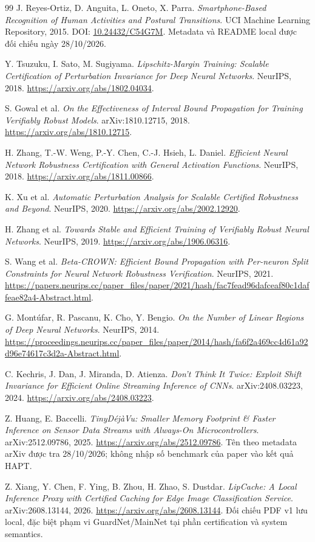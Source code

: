\documentclass[11pt,a4paper]{article}
\theoremstyle{remark}
\begin{document}
\begingroup\small
\begin{thebibliography}{99}
 J. Reyes-Ortiz, D. Anguita, L. Oneto, X. Parra.
\emph{Smartphone-Based Recognition of Human Activities and Postural
Transitions}. UCI Machine Learning Repository, 2015.
DOI: \href{https://doi.org/10.24432/C54G7M}{10.24432/C54G7M}.
Metadata và README local được đối chiếu ngày 28/10/2026.

 Y. Tsuzuku, I. Sato, M. Sugiyama.
\emph{Lipschitz-Margin Training: Scalable Certification of Perturbation
Invariance for Deep Neural Networks}. NeurIPS, 2018.
\url{https://arxiv.org/abs/1802.04034}.

 S. Gowal et al.
\emph{On the Effectiveness of Interval Bound Propagation for Training
Verifiably Robust Models}. arXiv:1810.12715, 2018.
\url{https://arxiv.org/abs/1810.12715}.

 H. Zhang, T.-W. Weng, P.-Y. Chen, C.-J. Hsieh, L. Daniel.
\emph{Efficient Neural Network Robustness Certification with General
Activation Functions}. NeurIPS, 2018.
\url{https://arxiv.org/abs/1811.00866}.

 K. Xu et al.
\emph{Automatic Perturbation Analysis for Scalable Certified Robustness
and Beyond}. NeurIPS, 2020.
\url{https://arxiv.org/abs/2002.12920}.

 H. Zhang et al.
\emph{Towards Stable and Efficient Training of Verifiably Robust Neural
Networks}. NeurIPS, 2019.
\url{https://arxiv.org/abs/1906.06316}.

 S. Wang et al.
\emph{Beta-CROWN: Efficient Bound Propagation with Per-neuron Split
Constraints for Neural Network Robustness Verification}. NeurIPS, 2021.
\url{https://papers.neurips.cc/paper_files/paper/2021/hash/fac7fead96dafceaf80c1daffeae82a4-Abstract.html}.

 G. Mont\'ufar, R. Pascanu, K. Cho, Y. Bengio.
\emph{On the Number of Linear Regions of Deep Neural Networks}.
NeurIPS, 2014.
\url{https://proceedings.neurips.cc/paper_files/paper/2014/hash/fa6f2a469cc4d61a92d96e74617c3d2a-Abstract.html}.

 C. Kechris, J. Dan, J. Miranda, D. Atienza.
\emph{Don't Think It Twice: Exploit Shift Invariance for Efficient Online
Streaming Inference of CNNs}. arXiv:2408.03223, 2024.
\url{https://arxiv.org/abs/2408.03223}.

 Z. Huang, E. Baccelli.
\emph{TinyD\'ej\`aVu: Smaller Memory Footprint \& Faster Inference on Sensor
Data Streams with Always-On Microcontrollers}. arXiv:2512.09786, 2025.
\url{https://arxiv.org/abs/2512.09786}. Tên theo metadata arXiv được tra
28/10/2026; không nhập số benchmark của paper vào kết quả HAPT.

 Z. Xiang, Y. Chen, F. Ying, B. Zhou, H. Zhao, S. Dustdar.
\emph{LipCache: A Local Inference Proxy with Certified Caching for Edge
Image Classification Service}. arXiv:2608.13144, 2026.
\url{https://arxiv.org/abs/2608.13144}. Đối chiếu PDF v1 lưu local,
đặc biệt phạm vi GuardNet/MainNet tại phần certification và system semantics.
\end{thebibliography}

\endgroup
\end{document}
